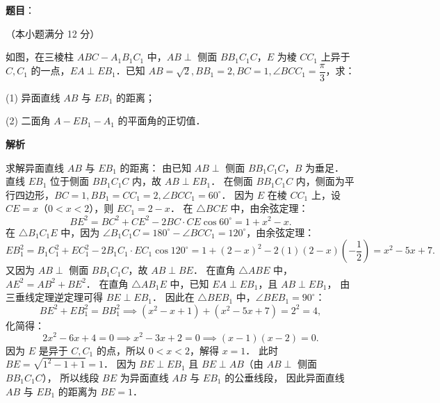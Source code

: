 \begin{answer}

\textbf{题目}：

（本小题满分 12 分）

如图，在三棱柱 $ABC - A_1B_1C_1$ 中，$AB \perp$ 侧面 $BB_1C_1C$，$E$ 为棱 $CC_1$ 上异于 $C, C_1$ 的一点，$EA \perp EB_1$．已知 $AB = \sqrt{2}, BB_1 = 2, BC = 1, \angle BCC_1 = \dfrac{\pi}{3}$，求：

(1) 异面直线 $AB$ 与 $EB_1$ 的距离；

(2) 二面角 $A - EB_1 - A_1$ 的平面角的正切值．
\nopagebreak[4]
\begin{center}\end{center}
\nopagebreak[4]
\textbf{解析}


求解异面直线 $AB$ 与 $EB_1$ 的距离：
由已知 $AB \perp$ 侧面 $BB_1C_1C$，$B$ 为垂足．
直线 $EB_1$ 位于侧面 $BB_1C_1C$ 内，故 $AB \perp EB_1$．
在侧面 $BB_1C_1C$ 内，侧面为平行四边形，$BC = 1, BB_1 = CC_1 = 2, \angle BCC_1 = 60^\circ$．
因为 $E$ 在棱 $CC_1$ 上，设 $CE = x$（$0 < x < 2$），则 $EC_1 = 2 - x$．
在 $\triangle BCE$ 中，由余弦定理：
\nopagebreak[4]
\[
BE^2 = BC^2 + CE^2 - 2 BC \cdot CE \cos 60^\circ = 1 + x^2 - x.
\]
在 $\triangle B_1C_1E$ 中，因为 $\angle B_1C_1C = 180^\circ - \angle BCC_1 = 120^\circ$，由余弦定理：
\nopagebreak[4]
\[
EB_1^2 = B_1C_1^2 + EC_1^2 - 2 B_1C_1 \cdot EC_1 \cos 120^\circ = 1 + (2 - x)^2 - 2(1)(2 - x)\left(-\frac{1}{2}\right) = x^2 - 5x + 7.
\]
又因为 $AB \perp$ 侧面 $BB_1C_1C$，故 $AB \perp BE$．
在直角 $\triangle ABE$ 中，$AE^2 = AB^2 + BE^2$．
在直角 $\triangle AB_1E$ 中，已知 $EA \perp EB_1$，且 $AB \perp EB_1$，
由三垂线定理逆定理可得 $BE \perp EB_1$．
因此在 $\triangle BEB_1$ 中，$\angle BEB_1 = 90^\circ$：
\nopagebreak[4]
\[
BE^2 + EB_1^2 = BB_1^2 \implies (x^2 - x + 1) + (x^2 - 5x + 7) = 2^2 = 4,
\]
化简得：
\nopagebreak[4]
\[
2x^2 - 6x + 4 = 0 \implies x^2 - 3x + 2 = 0 \implies (x - 1)(x - 2) = 0.
\]
因为 $E$ 是异于 $C, C_1$ 的点，所以 $0 < x < 2$，解得 $x = 1$．
此时 $BE = \sqrt{1^2 - 1 + 1} = 1$．
因为 $BE \perp EB_1$ 且 $BE \perp AB$（由 $AB \perp$ 侧面 $BB_1C_1C$），
所以线段 $BE$ 为异面直线 $AB$ 与 $EB_1$ 的公垂线段，
因此异面直线 $AB$ 与 $EB_1$ 的距离为 $BE = 1$．



\end{answer}
